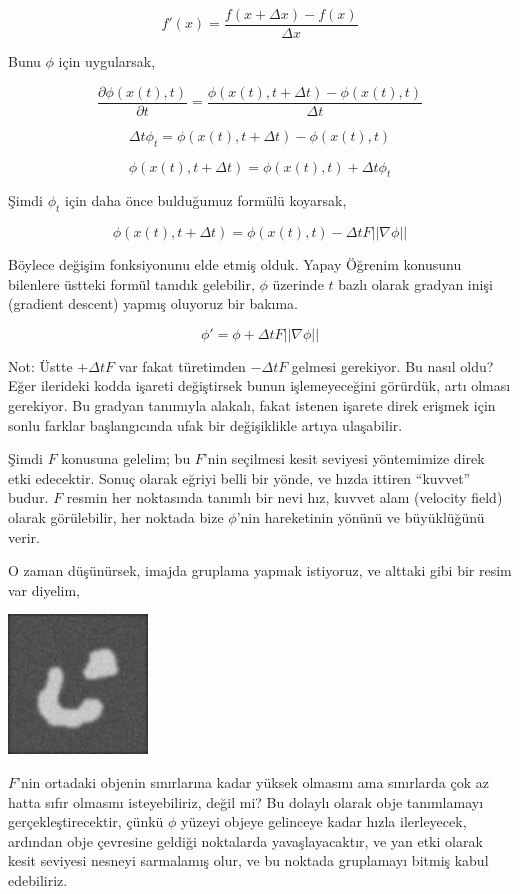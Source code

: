 \documentclass[12pt,fleqn]{article}\usepackage{../../common}
\begin{document}
$$
f'(x) = \frac{f(x+\Delta x) - f(x)}{\Delta x}
$$

Bunu $\phi$ için uygularsak,

$$
\frac{\partial \phi(x(t),t)}{\partial t} =
\frac{\phi(x(t),t+\Delta t) - \phi(x(t),t)}{\Delta t}
$$

$$
\Delta t \phi_t = \phi(x(t),t+\Delta t) - \phi(x(t),t)
$$

$$
\phi(x(t),t+\Delta t) = \phi(x(t),t) + \Delta t \phi_t
$$

Şimdi $\phi_t$ için daha önce bulduğumuz formülü koyarsak,

$$
\phi(x(t),t+\Delta t) = \phi(x(t),t) - \Delta t F ||\nabla \phi|| 
$$

Böylece değişim fonksiyonunu elde etmiş olduk. Yapay Öğrenim konusunu
bilenlere üstteki formül tanıdık gelebilir, $\phi$ üzerinde $t$ bazlı
olarak gradyan inişi (gradient descent) yapmış oluyoruz bir bakıma.

$$
\phi' = \phi + \Delta t F ||\nabla \phi ||
$$

Not: Üstte $+\Delta t F$ var fakat türetimden $-\Delta t F$ gelmesi
gerekiyor. Bu nasıl oldu?  Eğer ilerideki kodda işareti değiştirsek bunun
işlemeyeceğini görürdük, artı olması gerekiyor. Bu gradyan tanımıyla alakalı,
fakat istenen işarete direk erişmek için sonlu farklar başlangıcında ufak bir
değişiklikle artıya ulaşabilir.

Şimdi $F$ konusuna gelelim; bu $F$'nin seçilmesi kesit seviyesi yöntemimize
direk etki edecektir. Sonuç olarak eğriyi belli bir yönde, ve hızda ittiren
``kuvvet'' budur. $F$ resmin her noktasında tanımlı bir nevi hız, kuvvet
alanı (velocity field) olarak görülebilir, her noktada bize $\phi$'nin
hareketinin yönünü ve büyüklüğünü verir.

O zaman düşünürsek, imajda gruplama yapmak istiyoruz, ve alttaki gibi bir resim
var diyelim,

\includegraphics[width=10em]{twoObj.png}

$F$'nin ortadaki objenin sınırlarına kadar yüksek olmasını ama sınırlarda çok az
hatta sıfır olmasını isteyebiliriz, değil mi? Bu dolaylı olarak obje tanımlamayı
gerçekleştirecektir, çünkü $\phi$ yüzeyi objeye gelinceye kadar hızla
ilerleyecek, ardından obje çevresine geldiği noktalarda yavaşlayacaktır, ve yan
etki olarak kesit seviyesi nesneyi sarmalamış olur, ve bu noktada gruplamayı
bitmiş kabul edebiliriz.
\end{document}

